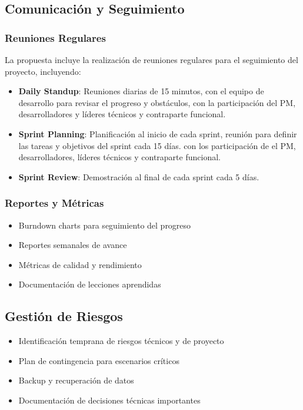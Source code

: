 \subsection{Comunicación y Seguimiento}
\subsubsection{Reuniones Regulares}
La propuesta incluye la realización de reuniones regulares para el seguimiento del proyecto, incluyendo:
\begin{itemize}
    \item \textbf{Daily Standup}: Reuniones diarias de 15 minutos, con el equipo de desarrollo para revisar el progreso y obstáculos, con la participación del PM, desarrolladores y líderes técnicos y contraparte funcional.
    \item \textbf{Sprint Planning}: Planificación al inicio de cada sprint, reunión para definir las tareas y objetivos del sprint cada 15 días. con los participación de el PM, desarrolladores, líderes técnicos y contraparte funcional.
    \item \textbf{Sprint Review}: Demostración al final de cada sprint cada 5 días.
\end{itemize}
\subsubsection{Reportes y Métricas}
\begin{itemize}
    \item Burndown charts para seguimiento del progreso
    \item Reportes semanales de avance
    \item Métricas de calidad y rendimiento
    \item Documentación de lecciones aprendidas
\end{itemize}
\subsection{Gestión de Riesgos}
\begin{itemize}
    \item Identificación temprana de riesgos técnicos y de proyecto
    \item Plan de contingencia para escenarios críticos
    \item Backup y recuperación de datos
    \item Documentación de decisiones técnicas importantes
\end{itemize}
